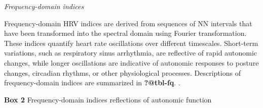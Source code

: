 \documentclass[
  letterpaper,
  headsepline=true,
  open=any]{scrbook}
\begin{document}
\emph{Frequency-domain indices}

Frequency-domain HRV indices are derived from sequences of NN intervals
that have been transformed into the spectral domain using Fourier
transformation. These indices quantify heart rate oscillations over
different timescales. Short-term variations, such as respiratory sinus
arrhythmia, are reflective of rapid autonomic changes, while longer
oscillations are indicative of autonomic responses to posture changes,
circadian rhythms, or other physiological processes. Descriptions of
frequency-domain indices are summarized in \textbf{?@tbl-fq}. .

\begin{table}

\caption{\textbf{Box 2} Frequency-domain indices reflections of
autonomic function}\begin{minipage}[t]{\linewidth}

{\centering 

}
\end{minipage}
\end{table}
\end{document}
